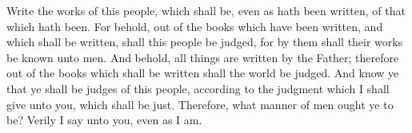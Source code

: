 Write the works of this people, which shall be, even as hath been written, of that which hath been.
\bverse \iffalse For behold, out of the books which have been written, and which shall be written, shall this people be judged, for by them shall their works be known unto men. \fi
For behold, out of the books which have been written, and which shall be written, shall this people be judged, for by them shall their works be known unto men.
\bverse \iffalse And behold, all things are written by the Father; therefore out of the books which shall be written shall the world be judged. \fi
And behold, all things are written by the Father; therefore out of the books which shall be written shall the world be judged.
\bverse \iffalse And know ye that ye shall be judges of this people, according to the judgment which I shall give unto you, which shall be just. \fi
And know ye that ye shall be judges of this people, according to the judgment which I shall give unto you, which shall be just.
Therefore, what manner of men ought ye to be? Verily I say unto you, even as I am.


